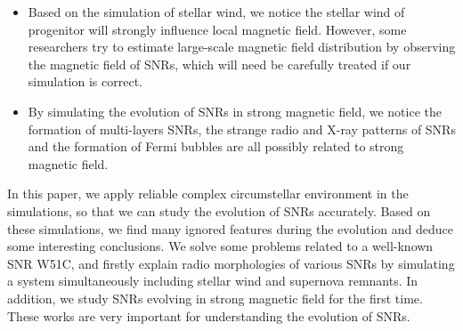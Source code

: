 \begin{itemize}
   \item Based on the simulation of stellar wind, we notice the stellar wind of progenitor will
   strongly influence local magnetic field.
   However, some researchers try to estimate large-scale magnetic field distribution by
   observing the magnetic field of SNRs, which will need be carefully treated if our simulation
   is correct.

   \item By simulating the evolution of SNRs in strong magnetic field, we notice
   the formation of multi-layers SNRs, the strange radio and X-ray patterns of SNRs
   and the formation of Fermi bubbles are all possibly related to strong magnetic field.
\end{itemize}

    In this paper, we apply reliable complex circumstellar environment in the simulations,
    so that we can study the evolution of SNRs accurately.
    Based on these simulations, we find many ignored features during the evolution and
    deduce some interesting conclusions.
    We solve some problems related to a well-known SNR W51C, and firstly explain radio
    morphologies of various SNRs by simulating a system simultaneously including stellar wind
    and supernova remnants.
    In addition, we study SNRs evolving in strong magnetic field for the first time.
    These works are very important for understanding the evolution of SNRs.

